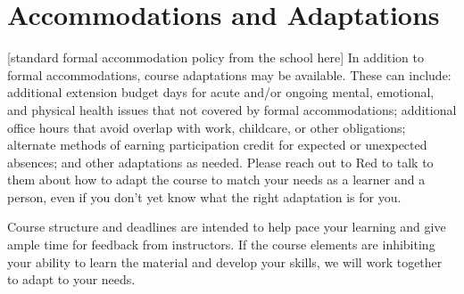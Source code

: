 \section{Accommodations and Adaptations}
[standard formal accommodation policy from the school here]
In addition to formal accommodations, course adaptations may be available. These can include: additional extension budget days for acute and/or ongoing mental, emotional, and physical health issues that not covered by formal accommodations; additional office hours that avoid overlap with work, childcare, or other obligations; alternate methods of earning participation credit for expected or unexpected absences; and other adaptations as needed. Please reach out to Red to talk to them about how to adapt the course to match your needs as a learner and a person, even if you don't yet know what the right adaptation is for you.

Course structure and deadlines are intended to help pace your learning and give ample time for feedback from instructors. If the course elements are inhibiting your ability to learn the material and develop your skills, we will work together to adapt to your needs.
